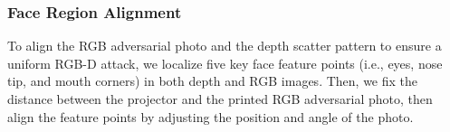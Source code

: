 \subsubsection{Face Region Alignment}
To align the RGB adversarial photo and the depth scatter pattern to ensure a uniform RGB-D attack, we localize five key face feature points (i.e., eyes, nose tip, and mouth corners) in both depth and RGB images. Then, we fix the distance between the projector and the printed RGB adversarial photo, then align the feature points by adjusting the position and angle of the photo.





